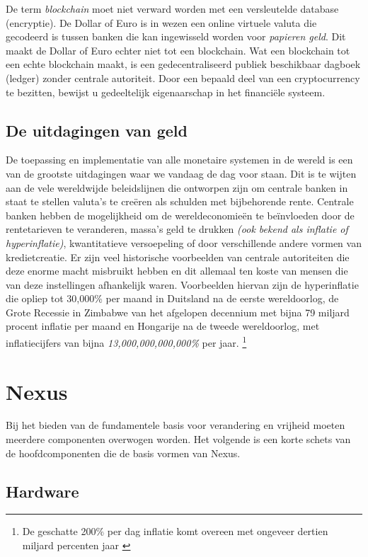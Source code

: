 \documentclass[11pt]{article}
\begin{document}
\noindent
De term \textit{blockchain} moet niet verward worden met een versleutelde database (encryptie). De Dollar of Euro is in wezen een online virtuele valuta die gecodeerd is tussen banken die kan ingewisseld worden voor \textit{papieren geld}. Dit maakt de Dollar of Euro echter niet tot een blockchain. Wat een blockchain tot een echte blockchain maakt, is een gedecentraliseerd publiek beschikbaar dagboek (ledger)  zonder centrale autoriteit. 
Door een bepaald deel van een cryptocurrency te bezitten, bewijst u gedeeltelijk eigenaarschap in het financi\"ele systeem.


\subsection{De uitdagingen van geld}

De toepassing en implementatie van alle monetaire systemen in de wereld is een van de grootste uitdagingen waar we vandaag de dag voor staan. Dit is te wijten aan de vele wereldwijde beleidslijnen die ontworpen zijn om centrale banken in staat te stellen valuta's te cre\"eren als schulden met bijbehorende rente. Centrale banken hebben de mogelijkheid om de wereldeconomie\"en te be\"invloeden door de rentetarieven te veranderen, massa's geld te drukken \textit{(ook bekend als inflatie of hyperinflatie)}, kwantitatieve versoepeling of door verschillende andere vormen van kredietcreatie. Er zijn veel historische voorbeelden van centrale autoriteiten die deze enorme macht misbruikt hebben en dit allemaal ten koste van mensen die van deze instellingen afhankelijk waren. Voorbeelden hiervan zijn de hyperinflatie die opliep tot 30,000\% per maand in Duitsland na de eerste wereldoorlog, de Grote Recessie in Zimbabwe van het afgelopen decennium met bijna 79 miljard procent inflatie per maand en Hongarije na de tweede wereldoorlog, met inflatiecijfers van bijna \textit{13,000,000,000,000\%} per jaar.  \footnote{De geschatte 200\% per dag inflatie komt overeen met ongeveer dertien miljard percenten jaar \cite{hyperinflation}}


\section{Nexus}

Bij het bieden van de fundamentele basis voor verandering en vrijheid moeten meerdere componenten overwogen worden. 
Het volgende is een korte schets van de hoofdcomponenten die de basis vormen van Nexus.

\subsection{Hardware}
\end{document}
